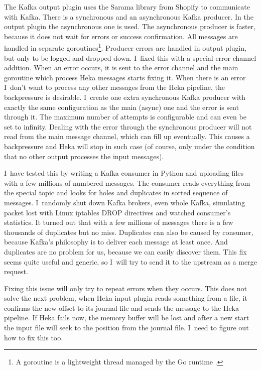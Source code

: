 The Kafka output plugin uses the Sarama library from Shopify \cite{shopify} to communicate with Kafka. There is a synchronous and an asynchronous Kafka producer. In the output plugin the asynchronous one is used. The asynchronous producer is faster, because it does not wait for errors or success confirmation. All messages are handled in separate goroutines\footnote{A goroutine is a lightweight thread managed by the Go runtime \cite{goroutine}.}. Producer errors are handled in output plugin, but only to be logged and dropped down. I~fixed this with a special error channel addition. When an error occurs, it is sent to the error channel and the main goroutine which process Heka messages starts fixing it. When there is an error I~don’t want to process any other messages from the Heka pipeline, the backpressure is desirable. I~create one extra synchronous Kafka producer with exactly the same configuration as the main (async) one and the error is sent through it. The maximum number of attempts is configurable and can even be set to infinity. Dealing with the error through the synchronous producer will not read from the main message channel, which can fill up eventually. This causes a backpressure and Heka will stop in such case (of course, only under the condition that no other output processes the input messages).

I~have tested this by writing a Kafka consumer in Python and uploading files with a few millions of numbered messages. The consumer reads everything from the special topic and looks for holes and duplicates in sorted sequence of messages. I~randomly shut down Kafka brokers, even whole Kafka, simulating packet lost with Linux iptables DROP directives and watched consumer’s statistics. It turned out that with a few millions of messages there is a few thousands of duplicates but no miss. Duplicates can also be caused by consumer, because Kafka’s philosophy is to deliver each message at least once. And duplicates are no problem for us, because we can easily discover them. This fix seems quite useful and generic, so I~will try to send it to the upstream as a merge request.

Fixing this issue will only try to repeat errors when they occurs. This does not solve the next problem, when Heka input plugin reads something from a file, it confirms the new offset to its journal file and sends the message to the Heka pipeline. If Heka fails now, the memory buffer will be lost and after a new start the input file will seek to the position from the journal file. I~need to figure out how to fix this too. 

